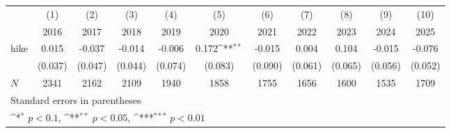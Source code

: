 {
\def\sym#1{\ifmmode^{#1}\else\(^{#1}\)\fi}
\begin{tabular}{l*{10}{c}}
\hline\hline
            &\multicolumn{1}{c}{(1)}&\multicolumn{1}{c}{(2)}&\multicolumn{1}{c}{(3)}&\multicolumn{1}{c}{(4)}&\multicolumn{1}{c}{(5)}&\multicolumn{1}{c}{(6)}&\multicolumn{1}{c}{(7)}&\multicolumn{1}{c}{(8)}&\multicolumn{1}{c}{(9)}&\multicolumn{1}{c}{(10)}\\
            &\multicolumn{1}{c}{2016}&\multicolumn{1}{c}{2017}&\multicolumn{1}{c}{2018}&\multicolumn{1}{c}{2019}&\multicolumn{1}{c}{2020}&\multicolumn{1}{c}{2021}&\multicolumn{1}{c}{2022}&\multicolumn{1}{c}{2023}&\multicolumn{1}{c}{2024}&\multicolumn{1}{c}{2025}\\
\hline
hike        &       0.015         &      -0.037         &      -0.014         &      -0.006         &       0.172\sym{**} &      -0.015         &       0.004         &       0.104         &      -0.015         &      -0.076         \\
            &     (0.037)         &     (0.047)         &     (0.044)         &     (0.074)         &     (0.083)         &     (0.090)         &     (0.061)         &     (0.065)         &     (0.056)         &     (0.052)         \\
\hline
\(N\)       &        2341         &        2162         &        2109         &        1940         &        1858         &        1755         &        1656         &        1600         &        1535         &        1709         \\
\hline\hline
\multicolumn{11}{l}{\footnotesize Standard errors in parentheses}\\
\multicolumn{11}{l}{\footnotesize \sym{*} \(p<0.1\), \sym{**} \(p<0.05\), \sym{***} \(p<0.01\)}\\
\end{tabular}
}
